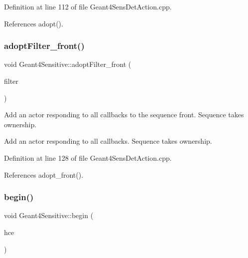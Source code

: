 Definition at line 112 of file Geant4\+Sens\+Det\+Action.\+cpp.



References adopt().

\hypertarget{class_d_d4hep_1_1_simulation_1_1_geant4_sensitive_a923ce4e474920fab8d2c7c6762e82ef4}{}\label{class_d_d4hep_1_1_simulation_1_1_geant4_sensitive_a923ce4e474920fab8d2c7c6762e82ef4} 
\subsubsection{\texorpdfstring{adopt\+Filter\+\_\+front()}{adoptFilter\_front()}}
{\footnotesize\ttfamily void Geant4\+Sensitive\+::adopt\+Filter\+\_\+front (\begin{DoxyParamCaption}\item[{\hyperlink{class_d_d4hep_1_1_simulation_1_1_geant4_action}{Geant4\+Action} $\ast$}]{filter }\end{DoxyParamCaption})}



Add an actor responding to all callbacks to the sequence front. Sequence takes ownership. 

Add an actor responding to all callbacks. Sequence takes ownership. 

Definition at line 128 of file Geant4\+Sens\+Det\+Action.\+cpp.



References adopt\+\_\+front().

\hypertarget{class_d_d4hep_1_1_simulation_1_1_geant4_sensitive_a2967b095e6c32ae82f68a8b25a086c86}{}\label{class_d_d4hep_1_1_simulation_1_1_geant4_sensitive_a2967b095e6c32ae82f68a8b25a086c86} 
\subsubsection{\texorpdfstring{begin()}{begin()}}
{\footnotesize\ttfamily void Geant4\+Sensitive\+::begin (\begin{DoxyParamCaption}\item[{G4\+H\+Cof\+This\+Event $\ast$}]{hce }\end{DoxyParamCaption})\hspace{0.3cm}{\ttfamily [virtual]}}



